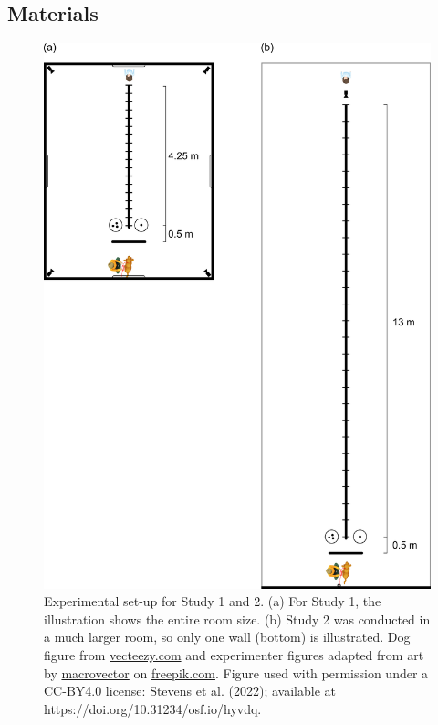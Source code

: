 \documentclass[
  pub,floatsintext]{apa6}
\begin{document}
\hypertarget{materials}{%
\subsection{Materials}\label{materials}}

\begin{figure}

{\centering \includegraphics[width=0.8\linewidth]{figures/setup_study} 

}

\caption{Experimental set-up for Study 1 and 2. (a) For Study 1, the illustration shows the entire room size.  (b) Study 2 was conducted in a much larger room, so only one wall (bottom) is illustrated. Dog figure from \href{https://vecteezy.com}{vecteezy.com} and experimenter figures adapted from art by \href{https://www.freepik.com/macrovector}{macrovector} on \href{https://www.freepik.com/free-vector/professions-top-view-colored-icons-set_3997920.htm}{freepik.com}. Figure used with permission under a CC-BY4.0 license: Stevens et al. (2022); available at https://doi.org/10.31234/osf.io/hyvdq.}\label{fig:exp-setup}
\end{figure}
\end{document}
